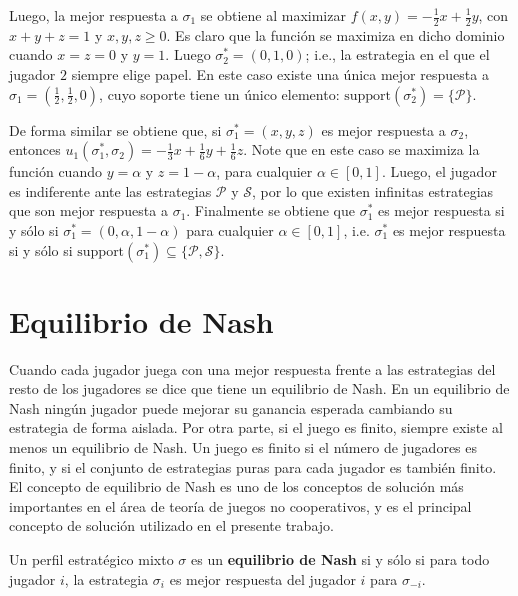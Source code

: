 Luego, la mejor respuesta a $\sigma_1$ se obtiene al maximizar $f(x, y) = -\frac{1}{2}x + \frac{1}{2}y$, con $x+y+z =1$ y $x, y, z \geq 0$. Es claro que la función se maximiza en dicho dominio cuando $x = z = 0$ y $y = 1$. Luego $\sigma^*_2 = (0, 1, 0)$; i.e., la estrategia en el que el jugador $2$ siempre elige papel. En este caso existe una única mejor respuesta a $\sigma_1 = \left(\frac{1}{2}, \frac{1}{2}, 0\right)$, cuyo soporte tiene un único elemento: $\text{support}(\sigma^*_2) = \{\mathcal{P}\}$.

De forma similar se obtiene que, si $\sigma^*_1 = (x, y, z)$ es mejor respuesta a $\sigma_2$, entonces $u_1(\sigma^*_1, \sigma_2) = -\frac{1}{3}x + \frac{1}{6}y + \frac{1}{6}z$. Note que en este caso se maximiza la función cuando $y = \alpha$ y $z = 1 -\alpha$, para cualquier $\alpha \in [0, 1]$. Luego, el jugador es indiferente ante las estrategias $\mathcal{P}$ y $\mathcal{S}$, por lo que existen infinitas estrategias que son mejor respuesta a $\sigma_1$. Finalmente se obtiene que $\sigma^*_1$ es mejor respuesta si y sólo si $\sigma^*_1 = (0, \alpha, 1 - \alpha)$ para cualquier  $\alpha \in [0, 1]$, i.e. $\sigma^*_1$ es mejor respuesta si y sólo si $\text{support}(\sigma^*_1) \subseteq \{\mathcal{P}, \mathcal{S} \}$.

\section{Equilibrio de Nash}
Cuando cada jugador juega con una mejor respuesta frente a las estrategias del resto de los jugadores se dice que tiene un equilibrio de Nash. En un equilibrio de Nash ningún jugador puede mejorar su ganancia esperada cambiando su estrategia de forma aislada. Por otra parte, si el juego es finito, siempre existe al menos un equilibrio de Nash. Un juego es finito si el número de jugadores es finito, y si el conjunto de estrategias puras para cada jugador es también finito. El concepto de equilibrio de Nash es uno de los conceptos de solución más importantes en el área de teoría de juegos no cooperativos, y es el principal concepto de solución utilizado en el presente trabajo.

\begin{definition}
\label{def:equilibrio-nash} Un perfil estratégico mixto $\sigma$ es un \textbf{equilibrio de Nash} si y s\'olo si para todo jugador $i$, la estrategia $\sigma_i$ es mejor respuesta del jugador $i$ para $\sigma_{-i}$.
\end{definition}

